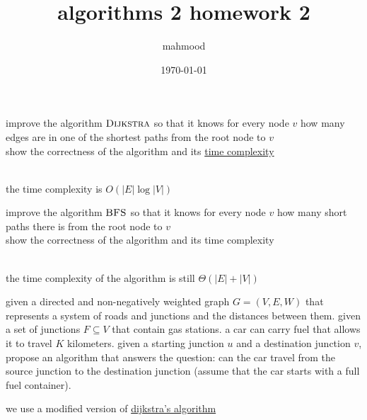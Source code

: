 \documentclass[a4paper,12pt]{article}
\author{mahmood}
\date{\today}
\title{algorithms 2 homework 2}
\begin{document}
\maketitle
\begin{question}
improve the algorithm \(\textsc{Dijkstra}\) so that it knows for every node \(v\) how many edges are in one of the shortest paths from the root node to \(v\)\\
show the correctness of the algorithm and its \href{20221130014441-time_complexity.org}{time complexity}\\
\begin{answer}
\\

the time complexity is \(O(|E|\log|V|)\)\\
\end{answer}
\end{question}
\begin{question}
improve the algorithm \(\textsc{BFS}\) so that it knows for every node \(v\) how many short paths there is from the root node to \(v\)\\
show the correctness of the algorithm and its time complexity\\
\begin{answer}
\\

the time complexity of the algorithm is still \(\Theta(|E|+|V|)\)\\
\end{answer}
\end{question}
\begin{question}
given a directed and non-negatively weighted graph \(G=(V,E,W)\) that represents a system of roads and junctions and the distances between them. given a set of junctions \(F \subseteq V\) that contain gas stations. a car can carry fuel that allows it to travel \(K\) kilometers. given a starting junction \(u\) and a destination junction \(v\), propose an algorithm that answers the question: can the car travel from the source junction to the destination junction (assume that the car starts with a full fuel container).\\
\begin{answer}
we use a modified version of \href{20230412172450-dijkstra_s_algorithm.org}{dijkstra's algorithm}\\
\\
\end{answer}
\end{question}
\end{document}
